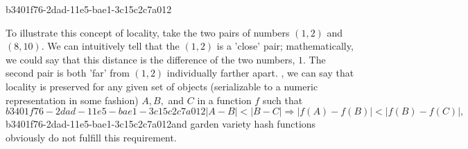 \documentclass[12pt]{article}
\begin{document}
b3401f76-2dad-11e5-bae1-3c15c2c7a012\par To illustrate this concept of locality, take the two pairs of numbers $(1,2)$ and $(8,10)$. We can intuitively tell that the $(1,2)$ is a 'close' pair; mathematically, we could say that this distance is the difference of the two numbers, $1$. The second pair is both 'far' from $(1,2)$ individually farther apart. , we can say that locality is preserved for any given set of objects (serializable to a numeric representation in some fashion) $A,B,$ and $C$ in a function $f$ such that
\begin{equation}
b3401f76-2dad-11e5-bae1-3c15c2c7a012|A-B| < |B-C| \Rightarrow |f(A)-f(B)| < |f(B) - f(C)|,
\end{equation}
b3401f76-2dad-11e5-bae1-3c15c2c7a012and garden variety hash functions obviously do not fulfill this requirement.

\printbibliography
\end{document}
